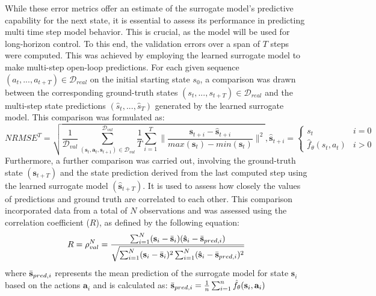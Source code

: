 While these error metrics offer an estimate of the surrogate model's predictive capability for the next state, it is essential to assess its performance in predicting multi time step model behavior. This is crucial, as the model will be used for long-horizon control. To this end, the validation errors over a span of $T$ steps were computed. This was achieved by employing the learned surrogate model to make multi-step open-loop predictions. For each given sequence $(a_t, ..., a_{t+T})\in\mathcal{D}_{real}$ on the initial starting state $s_0$, a comparison was drawn between the corresponding ground-truth states $(s_t, ..., s_{t+T})\in\mathcal{D}_{real}$ and the multi-step state predictions $(\hat{s}_t, ..., \hat{s}_T)$ generated by the learned surrogate model. This comparison was formulated as:
\begin{equation}
    NRMSE^{T} = \sqrt{\frac{1}{\mathcal{D}_{val}}\sum_{(\mathbf{s}_t,\mathbf{a}_t, \mathbf{s}_{t+1}) \in \mathcal{D}_{val}}^{\mathcal{D}_{val}}\frac{1}{T}\sum_{i=1}^{T}\lVert \frac{\mathbf{s}_{t+i}-\hat{\mathbf{s}}_{t+i}}{max(\mathbf{s}_t) - min(\mathbf{s}_t)}\rVert^2}, 
    \hat{\mathbf{s}}_{t+i} = \begin{cases} 
                        s_t & i=0 \\
                        \hat{f}_\theta(s_t, a_t) & i>0
                    \end{cases}
    \label{eq:NRMSET}
\end{equation}
Furthermore, a further comparison was carried out, involving the ground-truth state $(\mathbf{s}_{t+T})$ and the state prediction derived from the last computed step using the learned surrogate model $(\hat{\mathbf{s}}_{t+T})$. It is used to assess how closely the values of predictions and ground truth are correlated to each other. This comparison incorporated data from a total of $N$ observations and was assessed using the correlation coefficient ($R$), as defined by the following equation:
\begin{equation}
    R=\rho_{val}^{N} = \frac{\sum_{i=1}^{N}(\mathbf{s}_i - \Bar{\mathbf{s}}_i)(\hat{\mathbf{s}}_i-\Bar{\mathbf{s}}_{pred,i})}{\sqrt{\sum_{i=1}^{N}(\mathbf{s}_i - \Bar{\mathbf{s}}_i)^2 \sum_{i=1}^{N}(\hat{\mathbf{s}}_i-\Bar{\mathbf{s}}_{pred,i})^2}}
    \label{eq:R}
\end{equation}
where $\Bar{\mathbf{s}}_{pred,i}$ represents the mean prediction of the surrogate model for state $\mathbf{s}_i$ based on the actions $\mathbf{a}_i$ and is calculated as: $\Bar{\mathbf{s}}_{pred,i} = \frac{1}{n}\sum_{i=1}^{n}\hat{f}_\theta(\mathbf{s}_i, \mathbf{a}_i)$ 

